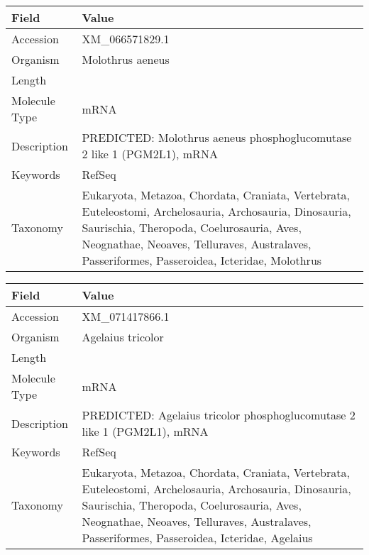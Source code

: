 \documentclass[10pt]{article}
\begin{document}
\vspace{1em}
{\footnotesize
\begin{longtable}{>{\raggedright\arraybackslash}p{4.5cm} >{\raggedright\arraybackslash}p{11.5cm}}
\textbf{Field} & \textbf{Value} \\
\hline
Accession & XM\_066571829.1 \\
Organism & Molothrus aeneus \\
Length & 5393 \\
Molecule Type & mRNA \\
Description & PREDICTED: Molothrus aeneus phosphoglucomutase 2 like 1 (PGM2L1), mRNA \\
Keywords & RefSeq \\
Taxonomy & Eukaryota, Metazoa, Chordata, Craniata, Vertebrata, Euteleostomi, Archelosauria, Archosauria, Dinosauria, Saurischia, Theropoda, Coelurosauria, Aves, Neognathae, Neoaves, Telluraves, Australaves, Passeriformes, Passeroidea, Icteridae, Molothrus \\
\end{longtable}
}

\vspace{1em}
{\footnotesize
\begin{longtable}{>{\raggedright\arraybackslash}p{4.5cm} >{\raggedright\arraybackslash}p{11.5cm}}
\textbf{Field} & \textbf{Value} \\
\hline
Accession & XM\_071417866.1 \\
Organism & Agelaius tricolor \\
Length & 5423 \\
Molecule Type & mRNA \\
Description & PREDICTED: Agelaius tricolor phosphoglucomutase 2 like 1 (PGM2L1), mRNA \\
Keywords & RefSeq \\
Taxonomy & Eukaryota, Metazoa, Chordata, Craniata, Vertebrata, Euteleostomi, Archelosauria, Archosauria, Dinosauria, Saurischia, Theropoda, Coelurosauria, Aves, Neognathae, Neoaves, Telluraves, Australaves, Passeriformes, Passeroidea, Icteridae, Agelaius \\
\end{longtable}
}
\end{document}
